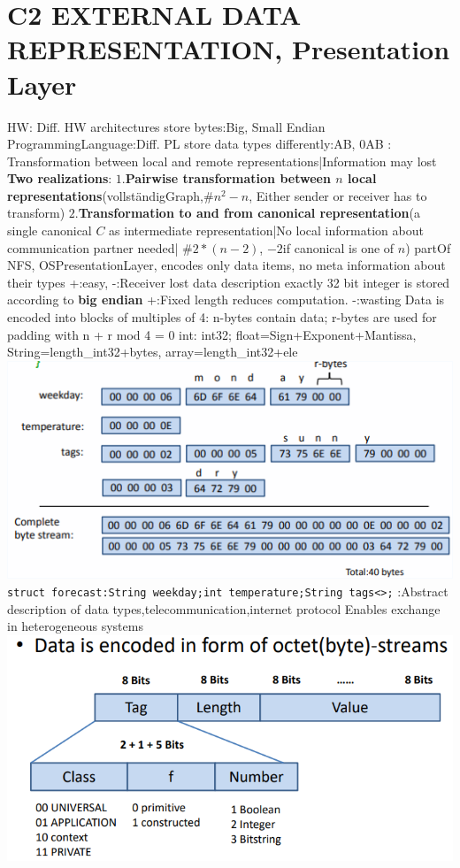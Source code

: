 \section{C2 EXTERNAL DATA REPRESENTATION, Presentation Layer} 
HW: Diff. HW architectures store bytes:Big, Small Endian
ProgrammingLanguage:Diff. PL store data types differently:AB, 0AB
: Transformation between local and remote representations|Information may lost
\textbf{Two realizations}:
$1.$\textbf{Pairwise transformation between $n$ local representations}(vollständigGraph,$\#n^2 - n$, Either sender or receiver has to transform) 
$2.$\textbf{Transformation to and from canonical representation}(a single canonical $C$ as intermediate representation|No local information about communication
partner needed| $\#2*(n-2)$, $ -2$if canonical is one of $n$)
 partOf NFS, OSPresentationLayer, encodes only data items, no meta information about their types +:easy, -:Receiver lost data description
\textbar exactly 32 bit integer is stored according to \textbf{big endian} +:Fixed length reduces computation. -:wasting
\textbar Data is encoded into blocks of multiples of 4: n-bytes contain data; r-bytes are used for padding with n + r mod 4 = 0
\textbar int: int32; float=Sign+Exponent+Mantissa, String=length\_int32+bytes, array=length\_int32+ele
\includegraphics[width=.8\linewidth]{chap2_2.png} 
\lstinline{struct forecast:String weekday;int temperature;String tags<>;}
:Abstract description of data types,telecommunication,internet protocol 
\textbar Enables exchange in heterogeneous systems
\textbar {}
\includegraphics[width=.45\linewidth]{chap2_3.png}
